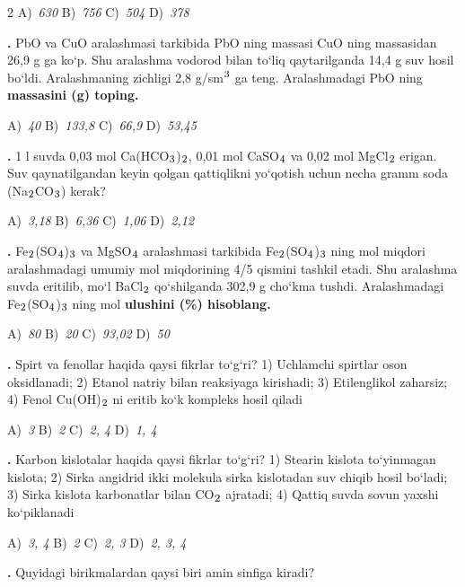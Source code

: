 \documentclass[11pt,a4paper]{article}
\renewcommand{\textsubscript}[1]{\ensuremath{_{\text{\fontsize{8}{8}\selectfont #1}}}}
\renewcommand{\textsuperscript}[1]{\ensuremath{^{\text{\fontsize{8}{8}\selectfont #1}}}}
\newcommand{\qn}[1]{\textbf{\fontsize{11.5}{13}\selectfont #1}}
\newcommand{\qsep}{\par\vspace{13pt}}
\begin{document}
\begin{multicols}{2}
\noindent A)~\textsl{630} \hfill B)~\textsl{756} \hfill C)~\textsl{504} \hfill D)~\textsl{378}\par
\qsep
\noindent\qn{17.} PbO va CuO aralashmasi tarkibida PbO ning massasi CuO ning massasidan 26,9 g ga ko`p. Shu aralashma vodorod bilan to`liq qaytarilganda 14,4 g suv hosil bo`ldi. Aralashmaning zichligi 2,8 g/sm\textsuperscript{3} ga teng. Aralashmadagi PbO ning \textbf{massasini (g) toping.}

\noindent A)~\textsl{40} \hfill B)~\textsl{133,8} \hfill C)~\textsl{66,9} \hfill D)~\textsl{53,45}\par
\qsep
\noindent\qn{18.} 1 l suvda 0,03 mol Ca(HCO\textsubscript{3})\textsubscript{2}, 0,01 mol CaSO\textsubscript{4} va 0,02 mol MgCl\textsubscript{2} erigan. Suv qaynatilgandan keyin qolgan qattiqlikni yo`qotish uchun necha gramm soda (Na\textsubscript{2}CO\textsubscript{3}) kerak?

\noindent A)~\textsl{3,18} \hfill B)~\textsl{6,36} \hfill C)~\textsl{1,06} \hfill D)~\textsl{2,12}\par
\qsep
\noindent\qn{19.} Fe\textsubscript{2}(SO\textsubscript{4})\textsubscript{3} va MgSO\textsubscript{4} aralashmasi tarkibida Fe\textsubscript{2}(SO\textsubscript{4})\textsubscript{3} ning mol miqdori aralashmadagi umumiy mol miqdorining 4/5 qismini tashkil etadi. Shu aralashma suvda eritilib, mo`l BaCl\textsubscript{2} qo`shilganda 302,9 g cho`kma tushdi. Aralashmadagi Fe\textsubscript{2}(SO\textsubscript{4})\textsubscript{3} ning mol \textbf{ulushini (\%) hisoblang.}

\noindent A)~\textsl{80} \hfill B)~\textsl{20} \hfill C)~\textsl{93,02} \hfill D)~\textsl{50}\par
\qsep
\noindent\qn{20.} Spirt va fenollar haqida qaysi fikrlar to`g`ri? 1) Uchlamchi spirtlar oson oksidlanadi; 2) Etanol natriy bilan reaksiyaga kirishadi; 3) Etilenglikol zaharsiz; 4) Fenol Cu(OH)\textsubscript{2} ni eritib ko`k kompleks hosil qiladi

\noindent A)~\textsl{3} \hfill B)~\textsl{2} \hfill C)~\textsl{2, 4} \hfill D)~\textsl{1, 4}\par
\qsep
\noindent\qn{21.} Karbon kislotalar haqida qaysi fikrlar to`g`ri? 1) Stearin kislota to`yinmagan kislota; 2) Sirka angidrid ikki molekula sirka kislotadan suv chiqib hosil bo`ladi; 3) Sirka kislota karbonatlar bilan CO\textsubscript{2} ajratadi; 4) Qattiq suvda sovun yaxshi ko`piklanadi

\noindent A)~\textsl{3, 4} \hfill B)~\textsl{2} \hfill C)~\textsl{2, 3} \hfill D)~\textsl{2, 3, 4}\par
\qsep
\noindent\qn{22.} Quyidagi birikmalardan qaysi biri amin sinfiga kiradi?


\end{multicols}
\end{document}
